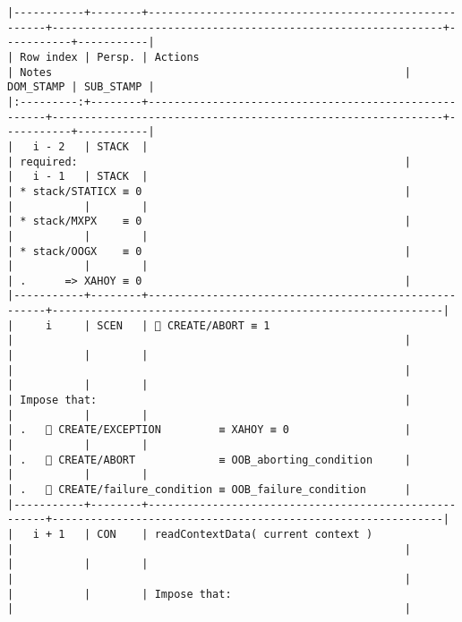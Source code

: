 \documentclass[varwidth=\maxdimen,margin=0.5cm,multi={verbatim}]{standalone}
\begin{document}
\begin{verbatim}
|-----------+--------+------------------------------------------------------+-------------------------------------------------------------+-----------+-----------|
| Row index | Persp. | Actions                                              | Notes                                                       | DOM_STAMP | SUB_STAMP |
|:---------:+--------+------------------------------------------------------+-------------------------------------------------------------+-----------+-----------|
|   i - 2   | STACK  |                                                      | required:                                                   |
|   i - 1   | STACK  |                                                      | * stack/STATICX ≡ 0                                         |
|           |        |                                                      | * stack/MXPX    ≡ 0                                         |
|           |        |                                                      | * stack/OOGX    ≡ 0                                         |
|           |        |                                                      | .      => XAHOY ≡ 0                                         |
|-----------+--------+------------------------------------------------------+-------------------------------------------------------------|
|     i     | SCEN   |  CREATE/ABORT ≡ 1                                   |                                                             |
|           |        |                                                      |                                                             |
|           |        |                                                      | Impose that:                                                |
|           |        |                                                      | .    CREATE/EXCEPTION         ≡ XAHOY ≡ 0                  |
|           |        |                                                      | .    CREATE/ABORT             ≡ OOB_aborting_condition     |
|           |        |                                                      | .    CREATE/failure_condition ≡ OOB_failure_condition      |
|-----------+--------+------------------------------------------------------+-------------------------------------------------------------|
|   i + 1   | CON    | readContextData( current context )                   |                                                             |
|           |        |                                                      |                                                             |
|           |        | Impose that:                                         |                                                             |

\end{verbatim}
\end{document}
